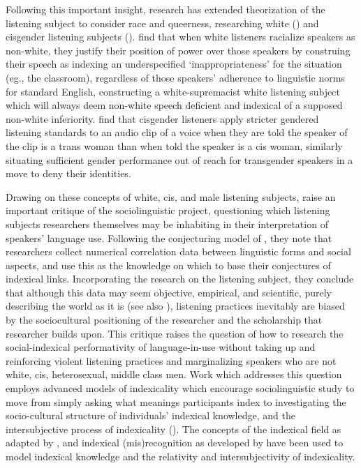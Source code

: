 \documentclass[12pt,twoside]{reedthesis}
\begin{document}
Following this important insight, research has extended theorization of the listening subject to consider race and queerness, researching white (\cite{flores_undoing_2015}) and cisgender listening subjects (\cite{calder_whose_2021, heffernan_constructing_2023, jessee_cisgender_2025, calder_interrogating_2025}). \textcite{flores_undoing_2015} find that when white listeners racialize speakers as non-white, they justify their position of power over those speakers by construing their speech as indexing an underspecified `inappropriateness' for the situation (eg., the classroom), regardless of those speakers' adherence to linguistic norms for standard English, constructing a white-supremacist white listening subject which will always deem non-white speech deficient and indexical of a supposed non-white inferiority. \textcite{jessee_cisgender_2025} find that cisgender listeners apply stricter gendered listening standards to an audio clip of a voice when they are told the speaker of the clip is a trans woman than when told the speaker is a cis woman, similarly situating sufficient gender performance out of reach for transgender speakers in a move to deny their identities.
	 
Drawing on these concepts of white, cis, and male listening subjects, \textcite{calder_whose_2021, calder_interrogating_2025} raise an important critique of the sociolinguistic project, questioning which listening subjects researchers themselves may be inhabiting in their interpretation of speakers' language use. Following the conjecturing model of \textcite{gal_signs_2019}, they note that researchers collect numerical correlation data between linguistic forms and social aspects, and use this as the knowledge on which to base their conjectures of indexical links. Incorporating the research on the listening subject, they conclude that although this data may seem objective, empirical, and scientific, purely describing the world as it is (see also \cite{zimman_beyond_2021}), listening practices inevitably are biased by the sociocultural positioning of the researcher and the scholarship that researcher builds upon. This critique raises the question of how to research the social-indexical performativity of language-in-use without taking up and reinforcing violent listening practices and marginalizing speakers who are not white, cis, heterosexual, middle class men. Work which addresses this question employs advanced models of indexicality which encourage sociolinguistic study to move from simply asking what meanings participants index to investigating the socio-cultural structure of individuals' indexical knowledge, and the intersubjective process of indexicality (\cite{calder_whose_2021, silverstein_indexical_2003, silverstein_language_2023, barrett_sexuality_2024}). The concepts of the indexical field as adapted by  \textcite{calder_whose_2021}, and indexical (mis)recognition as developed by \textcite{barrett_sexuality_2024} have been used to model indexical knowledge and the relativity and intersubjectivity of indexicality.
	 
\end{document}
